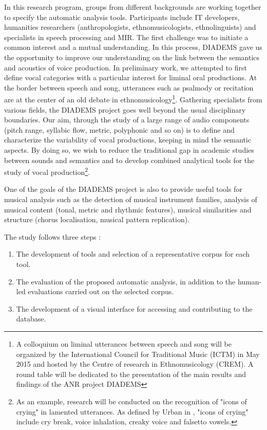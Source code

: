 \documentclass{sig-alternate}
\begin{document}
In this research program, groups from different backgrounds are working together to specify the automatic analysis tools. Participants include IT developers, humanities researchers (anthropologists, ethnomusicologists, ethnolinguists) and specialists in speech processing and MIR. The first challenge was to initiate a common interest and a mutual understanding. In this process, DIADEMS gave us the opportunity  to improve our understanding on the link between the semantics and acoustics of voice production. 
In preliminary work, we attempted to first define vocal categories with a particular interest for liminal oral productions. At the border between speech and song, utterances such as psalmody or recitation are at the center of an old debate in ethnomusicology\footnote{A colloquium on liminal utterances between speech and song will be organized by the International Council for Traditional Music (ICTM) in May 2015 and hosted by the Centre of research in Ethnomusicology (CREM). A round table will be dedicated to the presentation of the main results and findings of the ANR project DIADEMS}. Gathering specialists from various fields, the DIADEMS project goes well beyond the usual disciplinary boundaries. Our aim, through the study of a large range of audio components (pitch range, syllabic flow, metric, polyphonic and so on) is to define and characterize the variability of vocal productions, keeping in mind the semantic aspects. By doing so, we wish to reduce the traditional gap in academic studies between sounds and semantics and to develop combined analytical tools for the study of vocal production\footnote{As an example, research will be conducted on the recognition of "icons of crying" 
in lamented utterances. As defined by Urban in \cite{Urban88}, "icons of crying" include cry break, voice inhalation, creaky voice and falsetto vowels.}. 

One of the goals of the DIADEMS project is also to provide useful tools for musical analysis such as the detection of musical instrument families, analysis of musical content (tonal, metric and rhythmic features), musical similarities and structure (chorus localisation, musical pattern replication).

The study follows three steps : 
\begin{enumerate}
\item The development of tools and selection of a representative corpus
  for each tool.
\item The evaluation of the proposed automatic analysis, in addition to
  the human-led evaluations carried out on the selected corpus.
\item The development of a visual interface for accessing and contributing to the database.
\end{enumerate}
\end{document}
